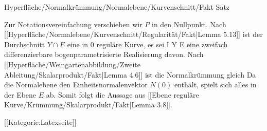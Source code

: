 {Hyperfläche/Normalkrümmung/Normalebene/Kurvenschnitt/Fakt}
{Satz}
{}
{

\faktzusatz {}
\faktzusatz {}

}
{

Zur Notationsvereinfachung verschieben wir $P$ in den Nullpunkt. Nach
[[Hyperfläche/Normalebene/Kurvenschnitt/Regularität/Fakt|Lemma 5.13]]
ist der Durchschnitt  $Y \cap E$ eine in $0$ reguläre Kurve, es sei
\maabbdisp {\gamma} { I } { Y \cap E
} {}
eine zweifach differenzierbare bogenparametrisierte Realisierung davon. Nach
[[Hyperfläche/Weingartenabbildung/Zweite Ableitung/Skalarprodukt/Fakt|Lemma 4.6]]
ist die Normalkrümmung gleich
 Da die Normalebene den Einheitsnormalenvektor $N(0)$ enthält, spielt sich alles in der Ebene $E$ ab. Somit folgt die Aussage aus
[[Ebene reguläre Kurve/Krümmung/Skalarprodukt/Fakt|Lemma 3.8]].

}

 [[Kategorie:Latexseite]]
